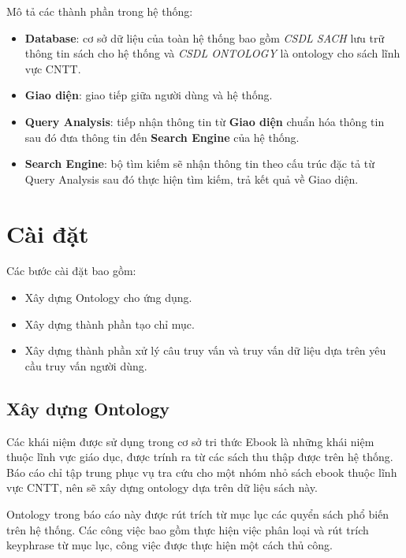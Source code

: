 Mô tả các thành phần trong hệ thống:
\begin{itemize}
    \item \textbf{Database}: cơ sở dữ liệu của toàn hệ thống bao gồm \textit{CSDL SACH} lưu trữ thông tin sách cho hệ thống và \textit{CSDL ONTOLOGY} là ontology cho sách lĩnh vực CNTT.
    \item \textbf{Giao diện}: giao tiếp giữa người dùng và hệ thống.
    \item \textbf{Query Analysis}: tiếp nhận thông tin từ \textbf{Giao diện} chuẩn hóa thông tin sau đó đưa thông tin đến \textbf{Search Engine} của hệ thống.
    \item \textbf{Search Engine}: bộ tìm kiếm sẽ nhận thông tin theo cấu trúc đặc tả từ Query Analysis sau đó thực hiện tìm kiếm, trả kết quả về Giao diện.
    
\end{itemize}

\section{Cài đặt}

Các bước cài đặt bao gồm:
\begin{itemize}
    \item Xây dựng Ontology cho ứng dụng.
    \item Xây dựng thành phần tạo chỉ mục.
    \item Xây dựng thành phần xử lý câu truy vấn và truy vấn dữ liệu dựa trên yêu cầu truy vấn người dùng.
\end{itemize}

\subsection{Xây dựng Ontology}
Các khái niệm được sử dụng trong cơ sở tri thức Ebook là những khái niệm thuộc lĩnh vực giáo dục, được trính ra từ các sách thu thập được trên hệ thống. Báo cáo chỉ tập trung phục vụ tra cứu cho một nhóm nhỏ sách ebook thuộc lĩnh vực CNTT, nên sẽ xây dựng ontology dựa trên dữ liệu sách này.

Ontology trong báo cáo này được rút trích từ mục lục các quyển sách phổ biến trên hệ thống. Các công việc bao gồm thực hiện việc phân loại và rút trích keyphrase từ mục lục, công việc được thực hiện một cách thủ công.

